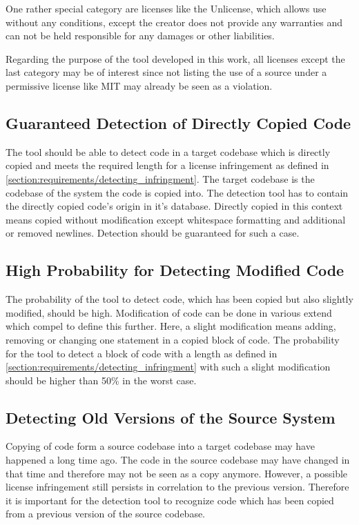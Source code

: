 One rather special category are licenses like the Unlicense, which allows use without any conditions, except the creator does not provide any warranties and can not be held responsible for any damages or other liabilities.

Regarding the purpose of the tool developed in this work, all licenses except the last category may be of interest since not listing the use of a source under a permissive license like MIT may already be seen as a violation.

\subsection{Guaranteed Detection of Directly Copied Code}\label{section:requirements/guaranteed_detection}
The tool should be able to detect code in a target codebase which is directly copied and meets the required length for a license infringement as defined in \autoref{section:requirements/detecting_infringment}.
The target codebase is the codebase of the system the code is copied into.
The detection tool has to contain the directly copied code's origin in it's database.
Directly copied in this context means copied without modification except whitespace formatting and additional or removed newlines.
Detection should be guaranteed for such a case.

\subsection{High Probability for Detecting Modified Code}\label{section:requirements/high_probability}
The probability of the tool to detect code, which has been copied but also slightly modified, should be high.
Modification of code can be done in various extend which compel to define this further.
Here, a slight modification means adding, removing or changing one statement in a copied block of code.
The probability for the tool to detect a block of code with a length as defined in \autoref{section:requirements/detecting_infringment} with such a slight modification should be higher than 50\% in the worst case. %

\subsection{Detecting Old Versions of the Source System}\label{section:requirements/detecting_old_version}
Copying of code form a source codebase into a target codebase may have happened a long time ago.
The code in the source codebase may have changed in that time and therefore may not be seen as a copy anymore.
However, a possible license infringement still persists in correlation to the previous version.
Therefore it is important for the detection tool to recognize code which has been copied from a previous version of the source codebase.


